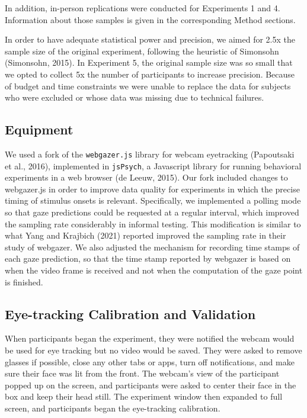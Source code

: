\documentclass[
  man,floatsintext]{apa6}
\begin{document}
In addition, in-person replications were conducted for Experiments 1 and 4. Information about those samples is given in the corresponding Method sections.

In order to have adequate statistical power and precision, we aimed for
2.5x the sample size of the original experiment, following the heuristic
of Simonsohn (Simonsohn, 2015). In Experiment 5, the original sample size was so
small that we opted to collect 5x the number of participants to increase
precision. Because of budget and time constraints we were unable to
replace the data for subjects who were excluded or whose data was
missing due to technical failures.

\hypertarget{equipment}{%
\subsection{Equipment}\label{equipment}}

We used a fork of the \texttt{webgazer.js} library for webcam eyetracking
(Papoutsaki et al., 2016), implemented in \texttt{jsPsych}, a Javascript
library for running behavioral experiments in a web browser
(de Leeuw, 2015). Our fork included changes to
webgazer.js in order to improve data quality for experiments in which
the precise timing of stimulus onsets is relevant. Specifically, we
implemented a polling mode so that gaze predictions could be requested
at a regular interval, which improved the sampling rate considerably in
informal testing. This modification is similar to what Yang and Krajbich
(2021) reported improved the sampling rate in their study of
webgazer. We also adjusted the mechanism for recording time stamps of
each gaze prediction, so that the time stamp reported by webgazer is
based on when the video frame is received and not when the computation
of the gaze point is finished.

\hypertarget{eye-tracking-calibration-and-validation}{%
\subsection{Eye-tracking Calibration and Validation}\label{eye-tracking-calibration-and-validation}}

When participants began the experiment, they were notified the webcam
would be used for eye tracking but no video would be saved. They were
asked to remove glasses if possible, close any other tabs or apps, turn
off notifications, and make sure their face was lit from the front. The
webcam's view of the participant popped up on the screen, and
participants were asked to center their face in the box and keep their
head still. The experiment window then expanded to full screen, and
participants began the eye-tracking calibration.
\end{document}
